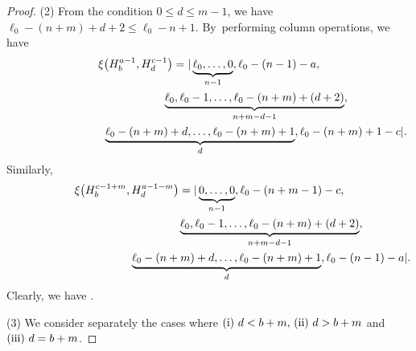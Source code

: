 \documentclass[10pt,a4paper]{amsart}
\numberwithin{equation}{section}
\begin{document}
\begin{proof}
(2) From the condition $0\leq d\leq m-1$, we have $\ell_{0}-(n+m)+d+2\leq \ell_{0}-n+1$. By~performing column operations, we have
\begin{gather*}
\xi\bigl(H^{a-1}_{b},H^{c-1}_{d}\bigr)=|\underbrace{\ell_0,\dots,0}_{n-1},\ell_{0}-(n-1)-a,\\
\hphantom{\xi\bigl(H^{a-1}_{b},H^{c-1}_{d}\bigr)=|}{}
\underbrace{\ell_{0},\ell_{0}-1,\dots,\ell_{0}-(n+m)+(d+2)}_{n+m-d-1},\nonumber\\
\hphantom{\xi\bigl(H^{a-1}_{b},H^{c-1}_{d}\bigr)=|}{}
\underbrace{\ell_{0}-(n+m)+d,\dots,\ell_{0}-(n+m)+1}_{d},\ell_{0}-(n+m)+1-c|\nonumber.
\end{gather*}
Similarly,
\begin{gather*}
\xi\bigl(H^{c-1+m}_{b},H^{a-1-m}_{d}\bigr)=|\underbrace{0,\dots,0}_{n-1},\ell_{0}-(n+m-1)-c,\\
\hphantom{\xi\bigl(H^{c-1+m}_{b},H^{a-1-m}_{d}\bigr)=|}{}
\underbrace{\ell_{0},\ell_{0}-1,\dots,\ell_{0}-(n+m)+(d+2)}_{n+m-d-1},\\
\hphantom{\xi\bigl(H^{c-1+m}_{b},H^{a-1-m}_{d}\bigr)=|}{}
\underbrace{\ell_{0}-(n+m)+d,\dots,\ell_{0}-(n+m)+1}_{d},\ell_{0}-(n-1)-a|.
\end{gather*}
Clearly, we have .

(3) We consider separately the cases where $({\rm i})\ d<b+m,\,({\rm ii})\ d>b+m$ and $({\rm iii})\ d=b+m$.


\end{proof}
\end{document}
